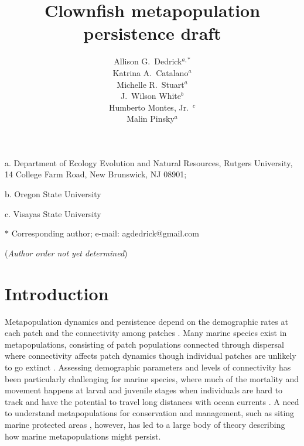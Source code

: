 \documentclass[12pt, oneside]{article}   	%
\author{}
\author{Allison G.\ Dedrick$^{a, \ast}$ \\
Katrina A.\ Catalano$^a$ \\
Michelle R.\ Stuart$^a$ \\
J.\ Wilson White$^b$ \\
Humberto Montes, Jr.\ $^c$ \\
Malin Pinsky$^a$}
\title{Clownfish metapopulation persistence draft}
\date{}
\begin{document}
\renewcommand{\topfraction}{0.95}
\maketitle{}

\noindent{} a. Department of Ecology Evolution and Natural Resources, Rutgers University, 14 College Farm Road, New Brunswick, NJ 08901;

\noindent{} b. Oregon State University

\noindent{} c. Visayas State University

\noindent{} $\ast$ Corresponding author; e-mail: agdedrick@gmail.com

(\textit{Author order not yet determined})


\bigskip





\linenumbers{}
\modulolinenumbers[3]

\section*{Introduction}

Metapopulation dynamics and persistence depend on the demographic rates at each patch and the connectivity among patches \citep[e.g.][]{hastings_persistence_2006, hanski1998metapopulation}. Many marine species exist in metapopulations, consisting of patch populations connected through dispersal where connectivity affects patch dynamics though individual patches are unlikely to go extinct \citep{kritzer2006marine}. Assessing demographic parameters and levels of connectivity has been particularly challenging for marine species, where much of the mortality and movement happens at larval and juvenile stages when individuals are hard to track and have the potential to travel long distances with ocean currents \citep[e.g.][]{kritzer2006marine, cowen_larval_2009, roughgarden_recruitment_1988}. A need to understand metapopulations for conservation and management, such as siting marine protected areas \citep[e.g.][]{botsford_dependence_2001,white_population_2010}, however, has led to a large body of theory describing how marine metapopulations might persist. %
\end{document}
